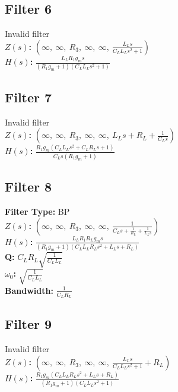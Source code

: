 \documentclass{article}
\begin{document}
\subsection*{Filter 6}
Invalid filter \\ 
\textbf{$Z(s)$:} $\left( \infty, \  \infty, \  R_{3}, \  \infty, \  \infty, \  \frac{L_{L} s}{C_{L} L_{L} s^{2} + 1}\right)$ \\ 
\textbf{$H(s)$:} $\frac{L_{L} R_{1} g_{m} s}{\left(R_{1} g_{m} + 1\right) \left(C_{L} L_{L} s^{2} + 1\right)}$ \\ 
\subsection*{Filter 7}
Invalid filter \\ 
\textbf{$Z(s)$:} $\left( \infty, \  \infty, \  R_{3}, \  \infty, \  \infty, \  L_{L} s + R_{L} + \frac{1}{C_{L} s}\right)$ \\ 
\textbf{$H(s)$:} $\frac{R_{1} g_{m} \left(C_{L} L_{L} s^{2} + C_{L} R_{L} s + 1\right)}{C_{L} s \left(R_{1} g_{m} + 1\right)}$ \\ 
\subsection*{Filter 8}
\textbf{Filter Type:} BP \\ 
\textbf{$Z(s)$:} $\left( \infty, \  \infty, \  R_{3}, \  \infty, \  \infty, \  \frac{1}{C_{L} s + \frac{1}{R_{L}} + \frac{1}{L_{L} s}}\right)$ \\ 
\textbf{$H(s)$:} $\frac{L_{L} R_{1} R_{L} g_{m} s}{\left(R_{1} g_{m} + 1\right) \left(C_{L} L_{L} R_{L} s^{2} + L_{L} s + R_{L}\right)}$ \\ 
\textbf{Q:} $C_{L} R_{L} \sqrt{\frac{1}{C_{L} L_{L}}}$ \\ 
\textbf{$\omega_0$:} $\sqrt{\frac{1}{C_{L} L_{L}}}$ \\ 
\textbf{Bandwidth:} $\frac{1}{C_{L} R_{L}}$ \\ 
\subsection*{Filter 9}
Invalid filter \\ 
\textbf{$Z(s)$:} $\left( \infty, \  \infty, \  R_{3}, \  \infty, \  \infty, \  \frac{L_{L} s}{C_{L} L_{L} s^{2} + 1} + R_{L}\right)$ \\ 
\textbf{$H(s)$:} $\frac{R_{1} g_{m} \left(C_{L} L_{L} R_{L} s^{2} + L_{L} s + R_{L}\right)}{\left(R_{1} g_{m} + 1\right) \left(C_{L} L_{L} s^{2} + 1\right)}$ \\ 
\end{document}
